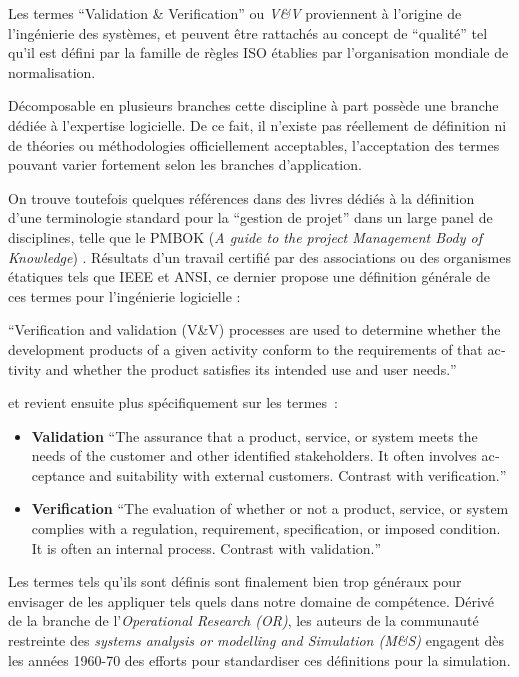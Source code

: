 Les termes \foreignquote{english}{Validation \& Verification} ou \textit{V\&V} proviennent à l'origine de l'ingénierie des systèmes, et peuvent être rattachés au concept de \enquote{qualité} tel qu'il est défini par la famille de règles ISO établies par l'organisation mondiale de normalisation. 

Décomposable en plusieurs branches cette discipline à part possède une branche dédiée à l'expertise logicielle. De ce fait, il n'existe pas réellement de définition ni de théories ou méthodologies officiellement acceptables, l'acceptation des termes pouvant varier fortement selon les branches d'application. 

On trouve toutefois quelques références dans des livres dédiés à la définition d'une terminologie standard pour la \enquote{gestion de projet} dans un large panel de disciplines, telle que le PMBOK (\textit{A guide to the project Management Body of Knowledge}) \autocite{PMBOK2013}. Résultats d'un travail certifié par des associations ou des organismes étatiques tels que IEEE et ANSI, ce dernier propose une définition générale de ces termes pour l'ingénierie logicielle : 

\foreignquote{english}{Verification and validation (V\&V) processes are used to determine whether the development products of a given activity conform to the requirements of that activity and whether the product satisfies its intended use and user needs.}

et revient ensuite plus spécifiquement sur les termes : 

\begin{itemize}
\item \textbf{Validation} \foreignquote{english}{The assurance that a product, service, or system meets the needs of the customer and other identified stakeholders. It often involves acceptance and suitability with external customers. Contrast with verification.}
\item \textbf{Verification} \foreignquote{english}{The evaluation of whether or not a product, service, or system complies with a regulation, requirement, specification, or imposed condition. It is often an internal process. Contrast with validation.}
\end{itemize}

Les termes tels qu'ils sont définis sont finalement bien trop généraux pour envisager de les appliquer tels quels dans notre domaine de compétence. Dérivé de la branche de l'\textit{Operational Research (OR)}, les auteurs de la communauté restreinte des \textit{systems analysis or modelling and Simulation (M\&S) } engagent dès les années 1960-70 des efforts pour standardiser ces définitions pour la simulation.

